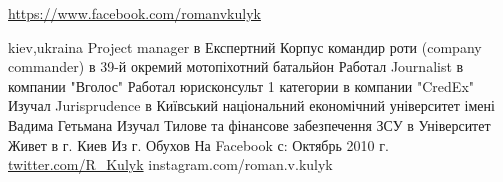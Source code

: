  
 
 
 
 

\url{https://www.facebook.com/romanvkulyk}\par
kiev,ukraina
Project manager в Експертний Корпус
командир роти (company commander) в 39-й окремий мотопіхотний батальйон
Работал Journalist в компании "Вголос"
Работал юрисконсульт 1 категории в компании "CredEx"
Изучал Jurisprudence в Київський національний економічний університет імені Вадима Гетьмана
Изучал Тилове та фінансове забезпечення ЗСУ в Університет
Живет в г. Киев
Из г. Обухов
На Facebook с: Октябрь 2010 г.
\url{twitter.com/R_Kulyk}
instagram.com/roman.v.kulyk

